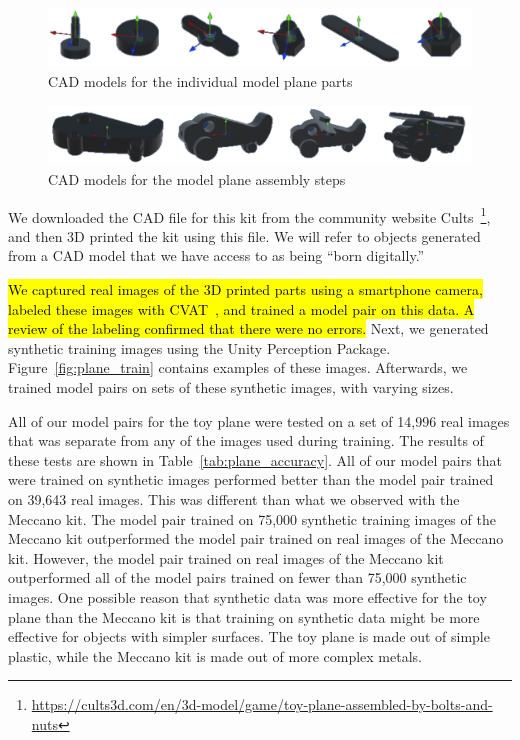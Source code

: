 \begin{figure}
  \includegraphics[width=\columnwidth]{figures/synthetic/plane_parts.pdf}
  \caption{
    CAD models for the individual model plane parts
  }\label{fig:plane_parts}
\end{figure}

\begin{figure}
  \includegraphics[width=\columnwidth]{figures/synthetic/plane_steps.pdf}
  \caption{
    CAD models for the model plane assembly steps
  }\label{fig:plane_steps}
\end{figure}

We downloaded the CAD file for this kit from the community website
Cults~\footnote{\url{https://cults3d.com/en/3d-model/game/toy-plane-assembled-by-bolts-and-nuts}},
and then 3D printed the kit using this file.
We will refer to objects generated from a CAD model that we have access to as
being ``born digitally.''

\hl{
We captured real images of the 3D printed parts using a smartphone camera,
labeled these images with CVAT~{\cite{CVAT}}, and trained a model pair on this
data.
A review of the labeling confirmed that there were no errors.
}
Next, we generated synthetic training images using the Unity Perception Package.
Figure~\ref{fig:plane_train} contains examples of these images.
Afterwards, we trained model pairs on sets of these synthetic images, with
varying sizes.

All of our model pairs for the toy plane were tested on a set of 14,996 real
images that was separate from any of the images used during training.
The results of these tests are shown in Table~\ref{tab:plane_accuracy}.
All of our model pairs that were trained on synthetic images performed better
than the model pair trained on 39,643 real images.
This was different than what we observed with the Meccano kit.
The model pair trained on 75,000 synthetic training images of the Meccano
kit outperformed the model pair trained on real images of the Meccano kit.
However, the model pair trained on real images of the Meccano kit outperformed
all of the model pairs trained on fewer than 75,000 synthetic images.
One possible reason that synthetic data was more effective for the toy plane
than the Meccano kit is that training on synthetic data might be more effective
for objects with simpler surfaces.
The toy plane is made out of simple plastic, while the Meccano kit is made out
of more complex metals.

